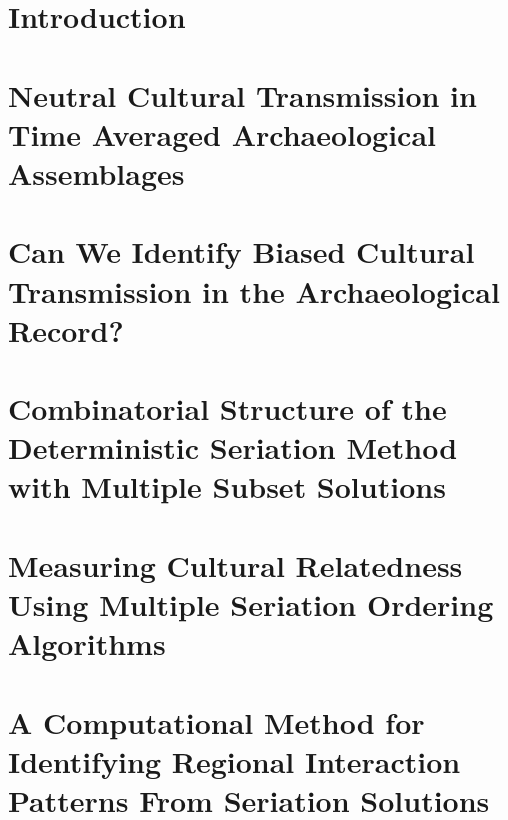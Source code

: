 \documentclass[letterpaper,12pt,final,openright,twoside]{memoir}
\date{\yearonly\today}
\begin{document}

\frontmatter %
\small




\mainmatter %
\normalsize
\acresetall    %

\DoubleSpacing

\chapter{Introduction}
\label{chap:intro}



\chapter{Neutral Cultural Transmission in Time Averaged Archaeological Assemblages}
\label{chap:timeaveraging-paper}


\chapter{Can We Identify Biased Cultural Transmission in the Archaeological Record?}
\label{chap:ctmixtures-paper}


\chapter{Combinatorial Structure of the Deterministic Seriation Method with Multiple Subset Solutions}
\label{chap:seriationcombinatorics-paper}


\chapter{Measuring Cultural Relatedness Using Multiple Seriation Ordering Algorithms}
\label{chap:multipleseriation-paper}


\chapter{A Computational Method for Identifying Regional Interaction Patterns From Seriation Solutions}
\label{chap:computational-metapopulation}

\end{document}
